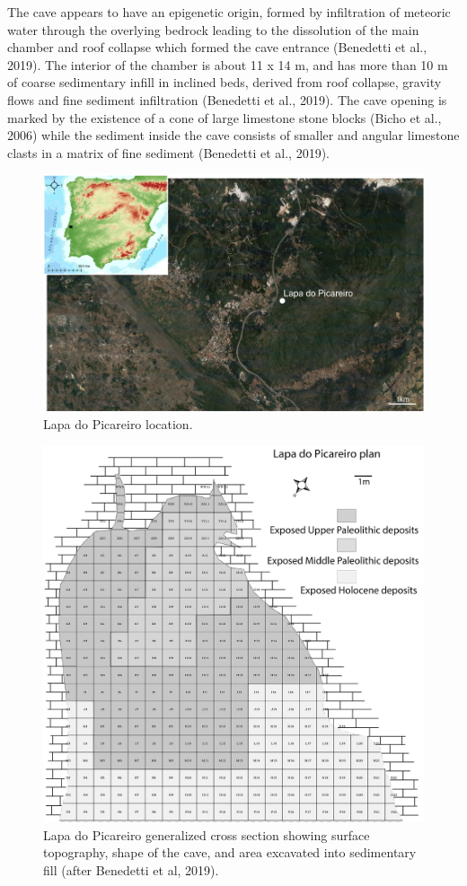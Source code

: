 \documentclass[12pt,twoside]{reedthesis}
\begin{document}
The cave appears to have an epigenetic origin, formed by infiltration of meteoric water through the overlying bedrock leading to the dissolution of the main chamber and roof collapse which formed the cave entrance (Benedetti et al., 2019). The interior of the chamber is about 11 x 14 m, and has more than 10 m of coarse sedimentary infill in inclined beds, derived from roof collapse, gravity flows and fine sediment infiltration (Benedetti et al., 2019). The cave opening is marked by the existence of a cone of large limestone stone blocks (Bicho et al., 2006) while the sediment inside the cave consists of smaller and angular limestone clasts in a matrix of fine sediment (Benedetti et al., 2019).
\begin{figure}
\includegraphics[width=1\linewidth]{figure/picareiro_map} \caption{Lapa do Picareiro location.}\label{fig:unnamed-chunk-4}
\end{figure}
\begin{figure}
\includegraphics[width=1\linewidth]{figure/LP_units} \caption{Lapa do Picareiro generalized cross section showing surface topography, shape of the cave, and area excavated into sedimentary fill (after Benedetti et al, 2019).}\label{fig:unnamed-chunk-5}
\end{figure}
\end{document}
